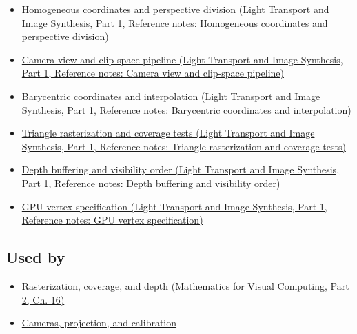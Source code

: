 \hypertarget{appendix-40426e4b2103-prerequisites}{}

\begin{itemize}
\tightlist
\item
  \href{../04-Light-Transport-and-Image-Synthesis-P01/main.pdf\#nameddest=appendix-cb3b26862282}{Homogeneous coordinates and perspective division (Light Transport and Image Synthesis, Part 1, Reference notes: Homogeneous coordinates and perspective division)}
\item
  \href{../04-Light-Transport-and-Image-Synthesis-P01/main.pdf\#nameddest=appendix-1c07d64f5e70}{Camera view and clip-space pipeline (Light Transport and Image Synthesis, Part 1, Reference notes: Camera view and clip-space pipeline)}
\item
  \href{../04-Light-Transport-and-Image-Synthesis-P01/main.pdf\#nameddest=appendix-02b9d9a81dca}{Barycentric coordinates and interpolation (Light Transport and Image Synthesis, Part 1, Reference notes: Barycentric coordinates and interpolation)}
\item
  \href{../04-Light-Transport-and-Image-Synthesis-P01/main.pdf\#nameddest=appendix-ed3f9bc298fe}{Triangle rasterization and coverage tests (Light Transport and Image Synthesis, Part 1, Reference notes: Triangle rasterization and coverage tests)}
\item
  \href{../04-Light-Transport-and-Image-Synthesis-P01/main.pdf\#nameddest=appendix-97578ed97952}{Depth buffering and visibility order (Light Transport and Image Synthesis, Part 1, Reference notes: Depth buffering and visibility order)}
\item
  \href{../04-Light-Transport-and-Image-Synthesis-P01/main.pdf\#nameddest=appendix-749ba51a6c25}{GPU vertex specification (Light Transport and Image Synthesis, Part 1, Reference notes: GPU vertex specification)}
\end{itemize}

\subsection{Used by}\label{appendix-40426e4b2103-used-by}

\hypertarget{appendix-40426e4b2103-used-by}{}

\begin{itemize}
\tightlist
\item
  \href{../02-Mathematics-for-Visual-Computing-P02/main.pdf\#nameddest=03-visual-computing-i-ch012-rasterization-coverage-and-depth}{Rasterization, coverage, and depth (Mathematics for Visual Computing, Part 2, Ch. 16)}
\item
  \hyperref[03-visual-computing-i-ch003-cameras-projection-and-calibration]{Cameras, projection, and calibration}
\end{itemize}

